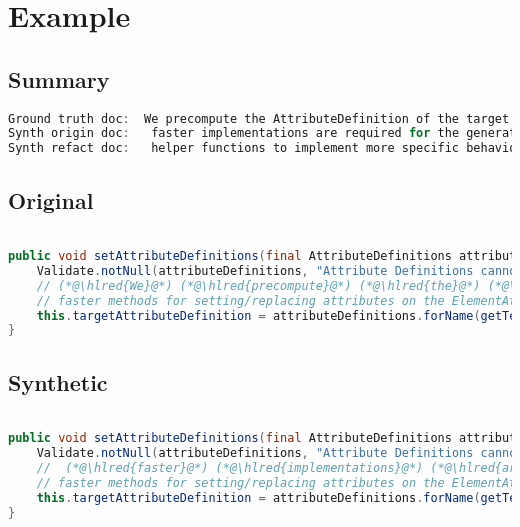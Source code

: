 \documentclass[11pt]{article}
\DeclareRobustCommand{\hlred}[1]{{\sethlcolor{YellowOrange}\hl{#1}}}
\begin{document}
\pagebreak
\section{Example}
\subsection{Summary}

\begin{lstlisting}[language=java]
Ground truth doc:  We precompute the AttributeDefinition of the target attribute in order to being able to use much
Synth origin doc:   faster implementations are required for the generation but cannot override or replace attributes instead of just
Synth refact doc:   helper functions to implement more specific behavior and other general purpose behavior to call in this
\end{lstlisting}

\subsection{Original}
\begin{lstlisting}[language=java]

public void setAttributeDefinitions(final AttributeDefinitions attributeDefinitions) {
    Validate.notNull(attributeDefinitions, "Attribute Definitions cannot be null");
    // (*@\hlred{We}@*) (*@\hlred{precompute}@*) (*@\hlred{the}@*) (*@\hlred{AttributeDefinition}@*) (*@\hlred{of}@*) the (*@\hlred{target}@*) (*@\hlred{attribute}@*) (*@\hlred{in}@*) (*@\hlred{order}@*) (*@\hlred{to}@*) (*@\hlred{being}@*) (*@\hlred{able}@*) (*@\hlred{to}@*) (*@\hlred{use}@*) (*@\hlred{much}@*)
    // faster methods for setting/replacing attributes on the ElementAttributes implementation
    this.targetAttributeDefinition = attributeDefinitions.forName(getTemplateMode(), this.targetAttrCompleteName);
}
\end{lstlisting}
\subsection{Synthetic}

\begin{lstlisting}[language=java]

public void setAttributeDefinitions(final AttributeDefinitions attributeDefinitions) {
    Validate.notNull(attributeDefinitions, "Attribute Definitions cannot be null");
    //  (*@\hlred{faster}@*) (*@\hlred{implementations}@*) (*@\hlred{are}@*) (*@\hlred{required}@*) (*@\hlred{for}@*) the (*@\hlred{generation}@*) (*@\hlred{but}@*) (*@\hlred{cannot}@*) (*@\hlred{override}@*) (*@\hlred{or}@*) (*@\hlred{replace}@*) (*@\hlred{attributes}@*) (*@\hlred{instead}@*) (*@\hlred{of}@*) (*@\hlred{just}@*)
    // faster methods for setting/replacing attributes on the ElementAttributes implementation
    this.targetAttributeDefinition = attributeDefinitions.forName(getTemplateMode(), this.targetAttrCompleteName);
}
\end{lstlisting}
\end{document}
